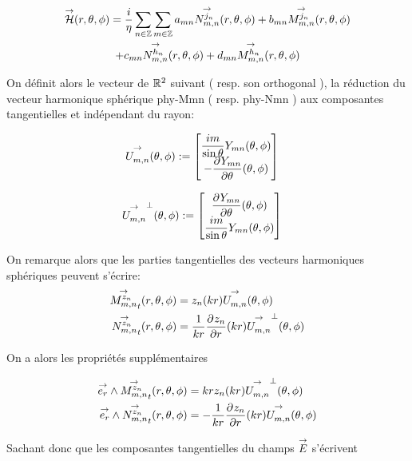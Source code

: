         \begin{multline}
            \vH(\rtp) = \frac{i}{\eta}\sum_{n\in\ZZ}\sum_{m\in\ZZ} a_{mn} \Nmn[j_n](\rtp) + b_{mn} \Mmn[j_n](\rtp)
            \\
            + c_{mn} \Nmn[h_n](\rtp) + d_{mn} \Mmn[h_n](\rtp)
        \end{multline}

        On définit alors le vecteur de \(\RR^2\) suivant ( resp. son orthogonal ), la réduction du vecteur harmonique sphérique \gls{phy-Mmn} ( resp. \gls{phy-Nmn} ) aux composantes tangentielles et indépendant du rayon:

        \begin{align}
            \label{eq:defUmn_tgt}
            \Umn(\tp) &:=
            \begin{bmatrix}
                \frac{im}{\sin\theta}Y_{mn}(\tp)
                \\
                - \ddr{\theta}{Y_{mn}}(\tp)
            \end{bmatrix}
        \end{align}

        \begin{align}
        \label{eq:defNmn_tgt}
          \Umn^\perp(\tp) &:=
          \begin{bmatrix}
            \ddr{\theta}{Y_{mn}}(\tp)
            \\
            \frac{im}{\sin\theta}Y_{mn}(\tp)
          \end{bmatrix}
        \end{align}


        On remarque alors que les parties tangentielles des vecteurs harmoniques sphériques peuvent s'écrire:
        \begin{align}
          \Mmn[z_n]_t(\rtp) &= z_n(kr)\Umn(\tp)
          \\
          \Nmn[z_n]_t(\rtp) &= \frac{1}{kr}\ddr{r}{z_n}(kr)\Umn^\perp(\tp)
        \end{align}

        On a alors les propriétés supplémentaires
        \begin{prop}
            \label{prop:Mmn_Nmn_vect}
            \begin{align}
              \vect{e_r} \pvect \Mmn[z_n]_t(\rtp) &= krz_n(kr)\Umn^\perp(\tp)
              \\
              \vect{e_r} \pvect \Nmn[z_n]_t(\rtp) &= -\frac{1}{kr}\ddr{r}{z_n}(kr)\Umn(\tp)
            \end{align}
        \end{prop}
        Sachant donc que les composantes tangentielles du champs \(\vE\) s'écrivent

